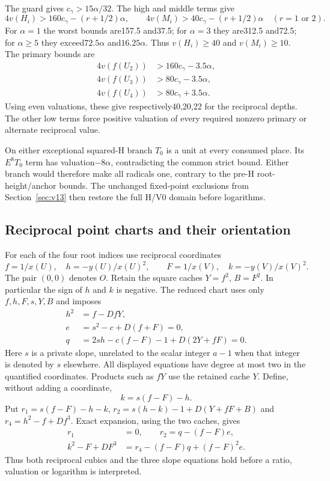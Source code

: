 The guard gives $c_\gamma>15\alpha/32$. The high and middle
terms give
\[
 4v(H_i)>160c_\gamma-(r+1/2)\alpha,\qquad
 4v(M_i)>40c_\gamma-(r+1/2)\alpha\quad(r=1\text{ or }2).
\]
For $\alpha=1$ the worst bounds are157.5 and37.5; for
$\alpha=3$ they are312.5 and72.5; for $\alpha\geq5$ they
exceed$72.5\alpha$ and$16.25\alpha$. Thus $v(H_i)\geq40$
and $v(M_i)\geq10$. The primary bounds are
\[
 \begin{split}
 4v(f(U_2))&>160c_\gamma-3.5\alpha,\\
 4v(f(U_3))&>80c_\gamma-3.5\alpha,\\
 4v(f(U_4))&>80c_\gamma+3.5\alpha.
 \end{split}
\]
Using even valuations, these give respectively40,20,22 for the
reciprocal depths. The other low terms force positive valuation
of every required nonzero primary or alternate reciprocal value.

On either exceptional squared-H branch $T_0$ is a unit at every
consumed place. Its $E^8T_0$ term has valuation$-8\alpha$,
contradicting the common strict bound. Either branch would
therefore make all radicals one, contrary to the pre-H
root-height/anchor bounds. The unchanged fixed-point exclusions
from Section~\ref{sec:v13} then restore the full H/V0 domain
before logarithms.

\subsection{Reciprocal point charts and their orientation}
\label{subsec:v14-reciprocal}
For each of the four root indices use reciprocal coordinates
\[
 f=1/x(U),\quad h=-y(U)/x(U)^2,\qquad
 F=1/x(V),\quad k=-y(V)/x(V)^2.
\]
The pair $(0,0)$ denotes $O$. Retain the square caches $Y=f^2$,
$B=F^2$. In particular the sign of $h$ and $k$ is negative.
The reduced chart uses only $f,h,F,s,Y,B$ and imposes
\begin{align}
 h^2&=f-DfY,\label{eq:v14-primary-curve}\\
 e&=s^2-c+D(f+F)=0,\label{eq:v14-slope-square}\\
 q&=2sh-c(f-F)-1+D(2Y+fF)=0.\label{eq:v14-reduced-slope}
\end{align}
Here $s$ is a private slope, unrelated to the scalar integer
$a-1$ when that integer is denoted by $s$ elsewhere.
All displayed equations have degree at most two in the quantified
coordinates. Products such as $fY$ use the retained cache $Y$.
Define, without adding a coordinate,
\[
 k=s(f-F)-h.
\]
Put $r_1=s(f-F)-h-k$, $r_2=s(h-k)-1+D(Y+fF+B)$ and
$r_4=h^2-f+Df^3$. Exact expansion, using the two caches, gives
\begin{align}
 r_1&=0,\qquad r_2=q-(f-F)e,\label{eq:v14-slope-restoration}\\
 k^2-F+DF^3&=r_4-(f-F)q+(f-F)^2e.\label{eq:v14-alt-restoration}
\end{align}
Thus both reciprocal cubics and the three slope equations hold
before a ratio, valuation or logarithm is interpreted.

